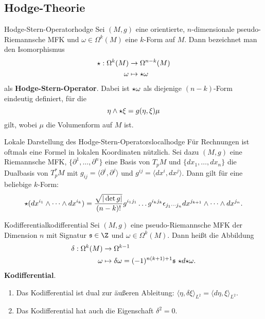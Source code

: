 \subsection{Hodge-Theorie}
\begin{definition}{Hodge-Stern-Operator}{hodge}
Sei $(M,g)$ eine orientierte, $n$-dimensionale pseudo-Riemannsche MFK und $\omega \in \Omega^k(M)$ eine $k$-Form auf $M$. Dann bezeichnet man den Isomorphismus
\begin{align}
{\star}: \Omega^k(M) &\to \Omega^{n-k} (M)\\
\omega &\mapsto {\star} \omega
\end{align}
als \textbf{Hodge-Stern-Operator}. Dabei ist ${\star} \omega$ als diejenige $(n-k)$-Form eindeutig definiert, für die
\begin{equation}
\eta \wedge {\star} \xi = g(\eta, \xi)\mu
\end{equation}
gilt, wobei $\mu$ die Volumenform auf $M$ ist.
\end{definition}
\begin{satz}{Lokale Darstellung des Hodge-Stern-Operators}{localhodge}
Für Rechnungen ist oftmals eine Formel in lokalen Koordinaten nützlich. Sei dazu $(M,g)$ eine Riemannsche MFK, $\{\partial^1, \dots, \partial^n\}$ eine Basis von $T_pM$ und $\{dx_1, \dots, dx_n\}$ die Dualbasis von $T^\ast_pM$ mit $g_{ij} = \langle \partial^i, \partial^j \rangle$ und $g^{ij} = \langle dx^i, dx^j \rangle$. Dann gilt für eine beliebige $k$-Form:
\begin{equation}
{\star} (dx^{i_1} \wedge \cdots \wedge dx^{i_k}) = \frac{\sqrt{|\det g|}}{(n-k)!} g^{i_1j_1} \dots g^{i_kj_k} \epsilon_{j_1 \cdots j_n} dx^{j_{k+1}} \wedge \cdots \wedge dx^{j_n}.
\end{equation}
\end{satz}
\begin{definition}{Kodifferential}{kodifferential}
Sei $(M,g)$ eine pseudo-Riemannsche MFK der Dimension $n$ mit Signatur $\mathfrak{s} \in \Z$ und $\omega \in \Omega^k(M)$. Dann heißt die Abbildung
\begin{align}
\delta: \Omega^k(M) &\to \Omega^{k-1}\\
\omega &\mapsto \delta \omega =  (-1)^{n(k+1)+1} \mathfrak{s} \ \hodge d \hodge \omega.
\end{align}
\textbf{Kodifferential}.
\end{definition}
\begin{bemerkungen}
\begin{enumerate}
\item Das Kodifferential ist dual zur äußeren Ableitung: $\langle \eta, \delta \xi \rangle_{L^2} = \langle d\eta, \xi \rangle_{L^2}$.
\item Das Kodifferential hat auch die Eigenschaft $\delta^2 = 0$.
\end{enumerate}
\end{bemerkungen}
